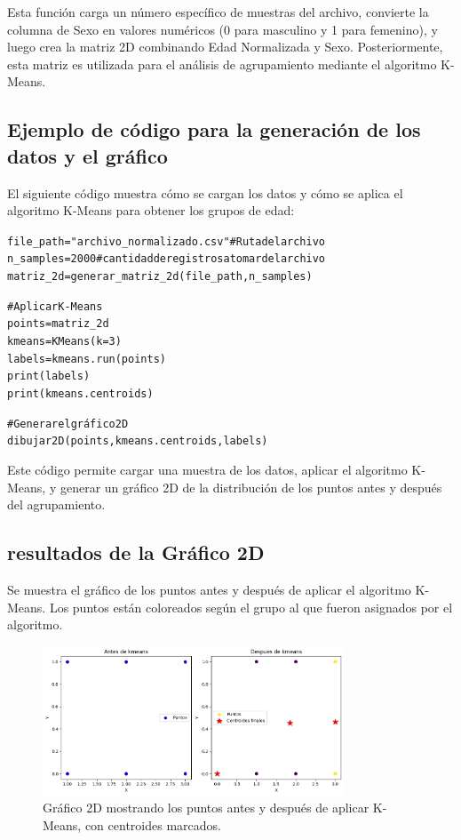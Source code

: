 \documentclass[a4paper, 10pt]{article}
\begin{document}
Esta función carga un número específico de muestras del archivo, convierte la columna de Sexo en valores numéricos (0 para masculino y 1 para femenino), y luego crea la matriz 2D combinando Edad Normalizada y Sexo. Posteriormente, esta matriz es utilizada para el análisis de agrupamiento mediante el algoritmo K-Means.


\subsection{Ejemplo de código para la generación de los datos y el gráfico}\label{s:2.1}

El siguiente código muestra cómo se cargan los datos y cómo se aplica el algoritmo K-Means para obtener los grupos de edad:

\begin{alltt}
file_path = "archivo_normalizado.csv"  # Ruta del archivo
n_samples = 2000  #cantidad de registros a tomar del archivo 
matriz_2d = generar_matriz_2d(file_path, n_samples)

# Aplicar K-Means
points = matriz_2d
kmeans = KMeans(k=3)
labels = kmeans.run(points)
print(labels)
print(kmeans.centroids)

# Generar el gráfico 2D
dibujar2D(points, kmeans.centroids, labels)
\end{alltt}

Este código permite cargar una muestra de los datos, aplicar el algoritmo K-Means, y generar un gráfico 2D de la distribución de los puntos antes y después del agrupamiento.

\subsection{resultados de  la Gráfico 2D}\label{s:3.2}

Se muestra el gráfico de los puntos antes y después de aplicar el algoritmo K-Means. Los puntos están coloreados según el grupo al que fueron asignados por el algoritmo.

\begin{figure}[ht]
\centering
\includegraphics[width=0.8\textwidth]{resultado.png}  %
\caption{Gráfico 2D mostrando los puntos antes y después de aplicar K-Means, con centroides marcados.}
\end{figure}
\end{document}
